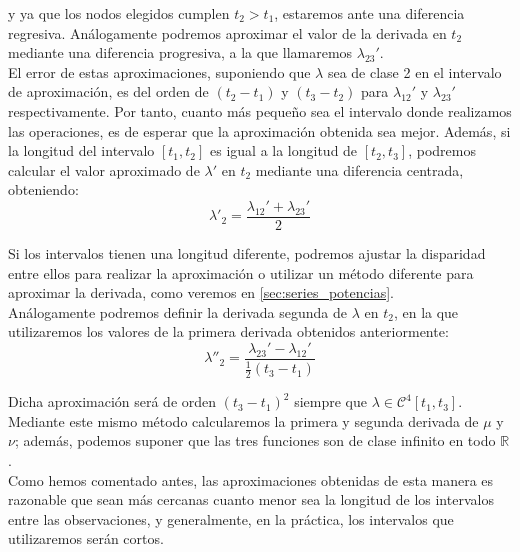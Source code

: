 \documentclass[11pt]{book}
\begin{document}
\noindent y ya que los nodos elegidos cumplen $t_2>t_1$, estaremos ante una diferencia regresiva. Análogamente podremos aproximar el valor de la derivada en $t_2$ mediante una diferencia progresiva, a la que llamaremos $\lambda_{23}'$.\\

El error de estas aproximaciones, suponiendo que $\lambda$ sea de clase 2 en el intervalo de aproximación, es del orden de $(t_2-t_1)$ y $(t_3-t_2)$ para $\lambda_{12}'$ y $\lambda_{23}'$ respectivamente. Por tanto, cuanto más pequeño sea el intervalo donde realizamos las operaciones, es de esperar que la aproximación obtenida sea mejor. Además, si la longitud del intervalo $[t_1,t_2]$ es igual a la longitud de $[t_2,t_3]$, podremos calcular el valor aproximado de $\lambda'$ en $t_2$ mediante una diferencia centrada, obteniendo:
\[
\lambda'_2=\frac{\lambda_{12}'+\lambda_{23}'}{2}
\]

Si los intervalos tienen una longitud diferente, podremos ajustar la disparidad entre ellos para realizar la aproximación o utilizar un método diferente para aproximar la derivada, como veremos en \ref{sec:series_potencias}.\\

Análogamente podremos definir la derivada segunda de $\lambda$ en $t_2$, en la que utilizaremos los valores de la primera derivada obtenidos anteriormente:
\[
\lambda''_2=\frac{\lambda_{23}'-\lambda_{12}'}{\frac{1}{2}(t_3-t_1)}
\]

Dicha aproximación será de orden $(t_3-t_1)^2$ siempre que $\lambda\in\mathcal{C}^4[t_1,t_3]$. Mediante este mismo método calcularemos la primera y segunda derivada de $\mu$ y $\nu$; además, podemos suponer que las tres funciones son de clase infinito en todo $\mathbb{R}$.\\

Como hemos comentado antes, las aproximaciones obtenidas de esta manera es razonable que sean más cercanas cuanto menor sea la longitud de los intervalos entre las observaciones, y generalmente, en la práctica, los intervalos que utilizaremos serán cortos.\\
\end{document}
